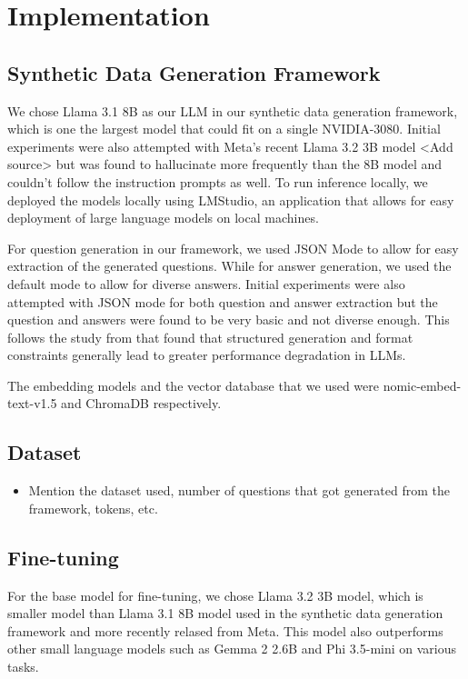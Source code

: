 \section{Implementation}\label{sec:implementation}


\subsection{Synthetic Data Generation Framework}

We chose Llama 3.1 8B as our LLM in our synthetic data generation framework, which is one the largest model that could fit on a single NVIDIA-3080. Initial experiments
were also attempted with Meta's recent Llama 3.2 3B model <Add source> but was found to hallucinate more frequently than the 8B model and couldn't follow the instruction prompts as well.
To run inference locally, we deployed the models locally using LMStudio, an application that allows for easy deployment of large language models on local machines.

For question generation in our framework, we used JSON Mode to allow for easy extraction of the generated questions. While for answer generation, we used the default
mode to allow for diverse answers. Initial experiments were also attempted with JSON mode for both question and answer extraction but the question and answers
were found to be very basic and not diverse enough. This follows the study from \cite{tam2024letspeakfreelystudy} that found that structured generation and format constraints
generally lead to greater performance degradation in LLMs.

The embedding models and the vector database that we used were nomic-embed-text-v1.5 and ChromaDB respectively.

\subsection{Dataset}

\begin{itemize}
   \item Mention the dataset used, number of questions that got generated from the framework, tokens, etc.
\end{itemize}


\subsection{Fine-tuning}


For the base model for fine-tuning, we chose Llama 3.2 3B model, which is smaller model than Llama 3.1 8B model used in the synthetic data generation framework and more 
recently relased from Meta. This model also outperforms other small language models such as Gemma 2 2.6B and Phi 3.5-mini on various tasks.

